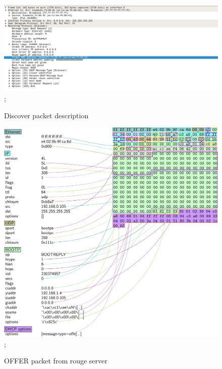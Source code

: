 \documentclass[12pt]{article}
\begin{document}
\begin{sloppypar}
     \begin{figure}[h]
    \centering
    \includegraphics[width=15 cm,height= 9 cm]{images/discover1-2.png};
    \caption{Discover packet description }
    \end{figure}
    
    \newpage
    \begin{figure}[h]
    \centering
    \includegraphics[width=15 cm,height=13 cm]{images/offer-1.png};
    \caption{OFFER packet from rouge server}
    \end{figure}
   

\end{sloppypar}
\end{document}
